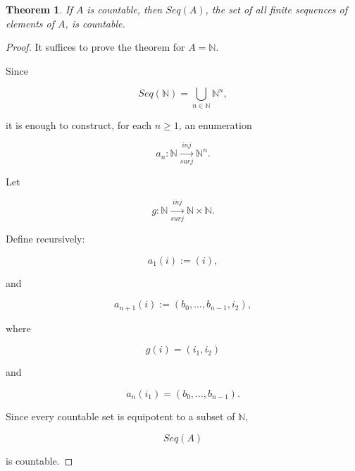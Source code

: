 \documentclass[10pt,a4paper]{book}
\newtheorem{theorem}{Theorem}[section]
\begin{document}
\begin{theorem}
    If $A$ is countable, then $Seq(A)$, the set of all finite sequences of elements of $A$,
    is countable.
\end{theorem}

\begin{proof}

    It suffices to prove the theorem for $A=\mathbb N$.

    Since

    \[
        Seq(\mathbb N)
        =
        \bigcup_{n\in\mathbb N}\mathbb N^n,
    \]

    it is enough to construct, for each $n\ge 1$, an enumeration

    \[
        a_n:\mathbb N\xrightarrow[surj]{inj}\mathbb N^n.
    \]

    Let

    \[
        g:\mathbb N\xrightarrow[surj]{inj}\mathbb N\times\mathbb N.
    \]

    Define recursively:

    \[
        a_1(i):=(i),
    \]

    and

    \[
        a_{n+1}(i)
        :=
        (b_0,\ldots,b_{n-1},i_2),
    \]

    where

    \[
        g(i)=(i_1,i_2)
    \]

    and

    \[
        a_n(i_1)=(b_0,\ldots,b_{n-1}).
    \]

    \begin{fitchproof}[arrayenv=tabular]


        \open

        \open
        \close


        \close





    \end{fitchproof}

    Since every countable set is equipotent to a subset of $\mathbb N$,

    \[
        Seq(A)
    \]

    is countable.

\end{proof}
\end{document}
